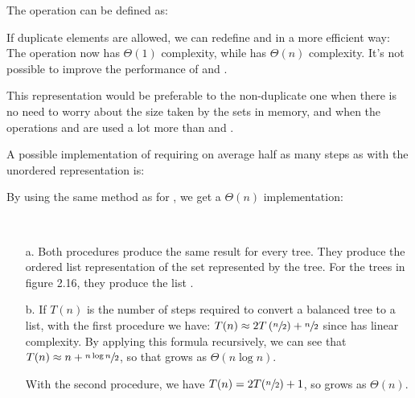 \begin{exe}[2.59]
    The  operation can be defined as:
\end{exe}

\begin{exe}[2.60]
    If duplicate elements are allowed, we can redefine  and 
     in a more efficient way:
    The operation  now has $\Theta(1)$ complexity, while 
     has $\Theta(n)$ complexity. It’s not possible to improve 
    the performance of  and .

    This representation would be preferable to the non-duplicate one when there 
    is no need to worry about the size taken by the sets in memory, and when the 
    operations  and  are used a lot more than 
     and .
\end{exe}

\begin{exe}[2.61]
    A possible implementation of  requiring on average half as 
    many steps as with the unordered representation is:
\end{exe}

\begin{exe}[2.62]
    By using the same method as for , we get 
    a $\Theta(n)$  implementation:
\end{exe}

\begin{exe}[2.63]
    \ \vspace{-20pt}
    \begin{itemize}
        \item[a.] Both procedures produce the same result for every tree. They 
            produce the ordered list representation of the set represented by 
            the tree. For the trees in figure 2.16, they produce the list 
            .
        \item[b.] If $T(n)$ is the number of steps required to convert 
            a balanced tree to a list, with the first procedure we have: $T(n) 
            \approx 2T\left(\sfrac{n}{2}\right) + \sfrac{n}{2}$ since 
             has linear complexity. By applying this formula 
            recursively, we can see that $T(n) \approx n +  \sfrac{n \log 
            n}{2}$, so that  grows as $\Theta(n \log{n})$.

            With the second procedure, we have $T(n) = 2T(\sfrac{n}{2}) + 1$, so 
             grows as $\Theta(n)$.
    \end{itemize}
\end{exe}

